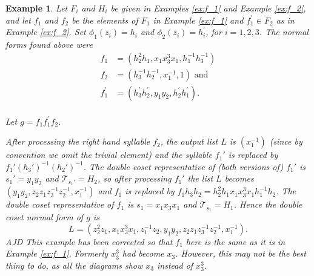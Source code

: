 \documentclass[a4paper,12pt]{article}
\newtheorem{exam}[theorem]{Example}
\newenvironment{example}{\begin{exam} \rm}{\end{exam}}
\numberwithin{equation}{section}
\numberwithin{figure}{section}
\newcommand{\cT}{\mathcal{T}}
\newenvironment{ajd1}{\noindent\color{red} AJD }{}
\newcommand{\ajd}[1]{\begin{ajd1} #1 \end{ajd1}}
\begin{document}
\begin{example}\label{ex:g}
Let $F_i$ and $H_i$ be given in Examples \ref{ex:f_1} and
Example \ref{ex:f_2}, and
let $f_1$ and $f_2$ be the elements of $F_1$ in Example \ref{ex:f_1} and
$f_1^\prime\in F_2$ as in Example \ref{ex:f_2}.
Set $\phi_1(z_i) = h_i$ and $\phi_2(z_i) = h_i^{\prime}$, for $i= 1,2,3$.
The normal forms found above were 
\begin{align*}
f_1&=(h_2^{2}h_1, x_1x_3^3x_1, h_1^{-1}h_3^{-1})\\
f_2&=(h_3^{-1}h_2^{-1}, x_1^{-1}, 1)\textrm{ and }\\
f_1^\prime&=(h^\prime_3h_2^\prime, y_1y_2, h_2^\prime h_1^\prime).\\
\end{align*}

Let $g =f_1 f_1^\prime f_2$. 

After processing the right hand syllable $f_2$, 
  the output list $L$ is  $(x_1^{-1})$ 
(since by convention we omit  the trivial element) and the syllable 
$f_1'$ is replaced by $f_1' (h_3')^{-1}(h_2')^{-1}$. The 
double coset representative of (both versions of) $f_1'$ is 
$s_1'=y_1y_2$ and $\cT_{s_1'}=H_2$, so after processing $f_1'$ the
list $L$ becomes $(y_1y_2, z_2z_1z_3^{-1}z_2^{-1}, x_1^{-1})$ and 
$f_1$ is replaced by $f_1h_3h_2=h_2^{2}h_1 x_1x_3^3x_1 h_1^{-1}h_2$. 
The double coset representative of $f_1$ is $s_1=x_1x_3x_1$ and 
$\cT_{s_1}=H_1$. 
Hence the  double coset normal form of $g$ is 
\[L=(z_2^2 z_1,  x_1 x_3^3 x_1, z_1^{-1}z_2,
y_1y_2, z_2 z_1z_3^{-1}z_2^{-1}, x_1^{-1}).
\]
\ajd{This example has been corrected so that $f_1$ here is the same as it is in Example \ref{ex:f_1}.
  Formerly $x_3^3$ had become $x_3$. However, this may not be the best thing to do, as all the
diagrams show $x_3$ instead of $x_3^3$.}
\end{example}
\end{document}
